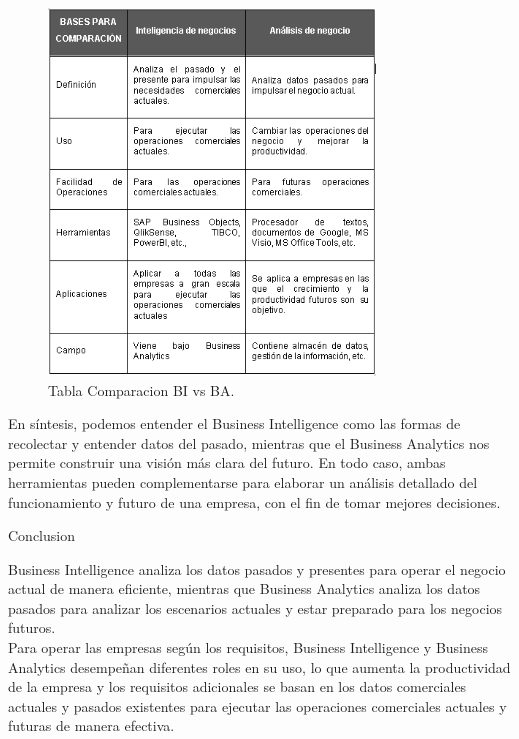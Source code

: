 \documentclass[preprint,12pt]{elsarticle}
\begin{document}
	\begin{figure}[htb]
		\begin{center}
			\includegraphics[width=8.69cm]{./Imagenes/img4}
			\caption{Tabla Comparacion BI vs BA.}
		\end{center}
	\end{figure}

	En síntesis, podemos entender el Business Intelligence como las formas de recolectar y entender datos del pasado, mientras que el Business Analytics nos permite construir una visión más clara del futuro. En todo caso, ambas herramientas pueden complementarse para elaborar un análisis detallado del funcionamiento y futuro de una empresa, con el fin de tomar mejores decisiones.\\
	
	\begin{LARGE}
		Conclusion\\
	\end{LARGE}
	
	Business Intelligence analiza los datos pasados y presentes para operar el negocio actual de manera eficiente, mientras que Business Analytics analiza los datos pasados para analizar los escenarios actuales y estar preparado para los negocios futuros.\\
	
	
	Para operar las empresas según los requisitos, Business Intelligence y Business Analytics desempeñan diferentes roles en su uso, lo que aumenta la productividad de la empresa y los requisitos adicionales se basan en los datos comerciales actuales y pasados existentes para ejecutar las operaciones comerciales actuales y futuras de manera efectiva.\\
	
\end{document}
